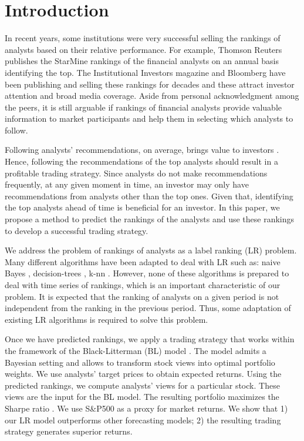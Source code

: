 \documentclass{llncs}\usepackage[]{graphicx}\usepackage[]{color}
\begin{document}



\section{Introduction}
\label{ch4-sec:introduction}


In recent years, some institutions were very successful selling the rankings of analysts based on their relative performance.  For example, Thomson Reuters publishes the StarMine rankings of the financial analysts on an annual basis identifying the top. The Institutional Investors magazine and Bloomberg have been publishing and selling these rankings for decades and these attract investor attention and broad media coverage. Aside from personal acknowledgment among the peers, it is still arguable if  rankings of financial analysts provide valuable information to  market participants and help them in selecting which analysts to follow.

Following analysts' recommendations, on average, brings value to investors \cite{womack1996}. Hence, following the recommendations of the top analysts should result in a profitable trading strategy. Since analysts do not make recommendations frequently,   at any given moment in time,  an investor may only have recommendations from analysts other than the top ones. Given that, identifying the top analysts ahead of time is beneficial for an investor. In this paper, we propose a method to predict the rankings of the analysts  and use these rankings to develop a successful trading strategy.

We address the problem of rankings of analysts as a label ranking (LR) problem. Many different algorithms have been adapted to deal with LR such as: naive Bayes \cite{aiguzhinov2010}, decision-trees  \cite{cheng2009}, k-nn \cite{brazdil2003,cheng2009}. However, none of these algorithms is prepared to deal with time series of rankings, which is an important characteristic of our problem. It is expected that the ranking of analysts on a given period is not independent from the ranking in the previous period. Thus, some adaptation of existing LR algorithms is required to solve this problem.

Once we have predicted rankings, we apply a trading strategy that  works within the framework of the Black-Litterman (BL) model \cite{black1992}. The model admits a Bayesian setting and allows to transform stock views into optimal portfolio weights. We use analysts' target prices to obtain expected returns. Using the predicted rankings, we compute analysts' views for a particular stock. These views are the input for the BL model. The resulting portfolio  maximizes the Sharpe ratio \cite{sharpe1966}. We use S\&P500 as a proxy for market returns. We show that 1) our LR model outperforms other forecasting models; 2) the resulting trading strategy generates superior returns.
\end{document}
